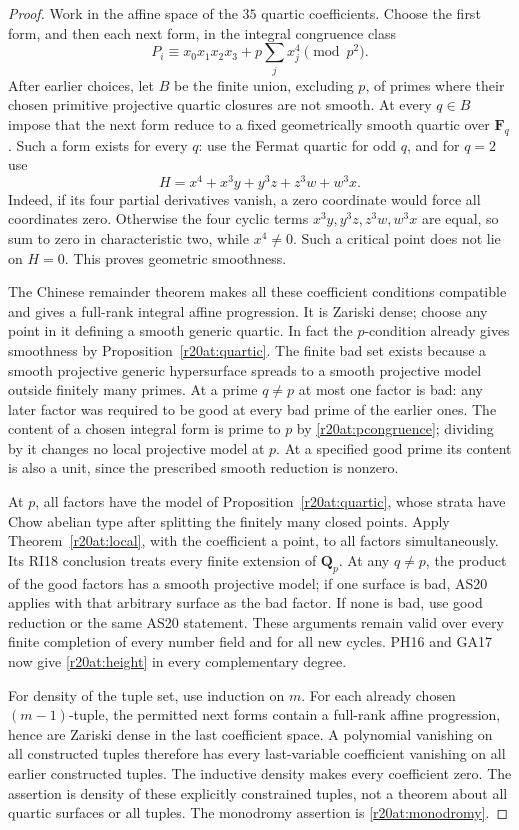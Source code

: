 \begin{proof}
Work in the affine space of the $35$ quartic coefficients.  Choose
the first form, and then each next form, in the integral congruence
class
\[
 P_i\equiv x_0x_1x_2x_3+p\sum_jx_j^4\pmod {p^2}.
 \tag{AT20.15}\label{r20at:pcongruence}
\]
After earlier choices, let $B$ be the finite union, excluding $p$,
of primes where their chosen primitive projective quartic closures
are not smooth.  At every $q\in B$ impose that the next form
reduce to a fixed geometrically smooth quartic over $\mathbf F_q$.
Such a form exists for every $q$: use the Fermat quartic for odd
$q$, and for $q=2$ use
\[
        H=x^4+x^3y+y^3z+z^3w+w^3x.
 \tag{AT20.16}\label{r20at:char2good}
\]
Indeed, if its four partial derivatives vanish, a zero coordinate
would force all coordinates zero.  Otherwise the four cyclic
terms $x^3y,y^3z,z^3w,w^3x$ are equal, so sum to zero in
characteristic two, while $x^4\ne0$.  Such a critical point
does not lie on $H=0$.  This proves geometric smoothness.

The Chinese remainder theorem makes all these coefficient
conditions compatible and gives a full-rank integral affine
progression.  It is Zariski dense; choose any point in it
defining a smooth generic quartic.  In fact the $p$-condition
already gives smoothness by Proposition~\ref{r20at:quartic}.
The finite bad set exists because a smooth projective generic
hypersurface spreads to a smooth projective model outside
finitely many primes.  At a prime $q\ne p$ at most one
factor is bad: any later factor was required to be good at
every bad prime of the earlier ones.
The content of a chosen integral form is prime to $p$ by
\eqref{r20at:pcongruence}; dividing by it changes no local
projective model at $p$.  At a specified good prime its content
is also a unit, since the prescribed smooth reduction is nonzero.

At $p$, all factors have the model of
Proposition~\ref{r20at:quartic}, whose strata have Chow abelian
type after splitting the finitely many closed points.  Apply
Theorem~\ref{r20at:local}, with the coefficient a point, to
all factors simultaneously.  Its RI18 conclusion treats every
finite extension of $\mathbf Q_p$.  At any $q\ne p$, the
product of the good factors has a smooth projective model;
if one surface is bad, AS20 applies with that arbitrary
surface as the bad factor.  If none is bad, use good reduction
or the same AS20 statement.  These arguments remain valid
over every finite completion of every number field and for
all new cycles.  PH16 and GA17 now give
\eqref{r20at:height} in every complementary degree.

For density of the tuple set, use induction on $m$.  For each
already chosen $(m-1)$-tuple, the permitted next forms contain
a full-rank affine progression, hence are Zariski dense in
the last coefficient space.  A polynomial vanishing on all
constructed tuples therefore has every last-variable
coefficient vanishing on all earlier constructed tuples.
The inductive density makes every coefficient zero.
The assertion is density of these explicitly constrained
tuples, not a theorem about all quartic surfaces or all tuples.
The monodromy assertion is \eqref{r20at:monodromy}.
\end{proof}

